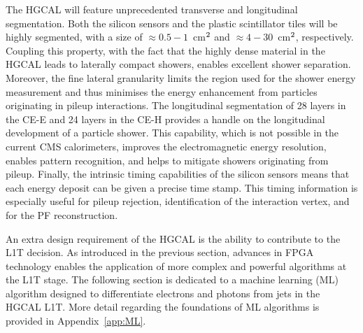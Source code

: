 The HGCAL will feature unprecedented transverse and longitudinal segmentation. Both the silicon sensors and the plastic scintillator tiles will be highly segmented, with a size of $\approx0.5-1$~cm$^{\rm{2}}$ and $\approx4-30$~cm$^{\rm{2}}$, respectively. Coupling this property, with the fact that the highly dense material in the HGCAL leads to laterally compact showers, enables excellent shower separation. Moreover, the fine lateral granularity limits the region used for the shower energy measurement and thus minimises the energy enhancement from particles originating in pileup interactions. The longitudinal segmentation of 28 layers in the CE-E and 24 layers in the CE-H provides a handle on the longitudinal development of a particle  shower. This capability, which is not possible in the current CMS calorimeters, improves the electromagnetic energy resolution, enables pattern recognition, and helps to mitigate showers originating from pileup. Finally, the intrinsic timing capabilities of the silicon sensors means that each energy deposit can be given a precise time stamp. This timing information is especially useful for pileup rejection, identification of the interaction vertex, and for the PF reconstruction.


An extra design requirement of the HGCAL is the ability to contribute to the L1T decision.
As introduced in the previous section, advances in FPGA technology enables the application of more complex and powerful algorithms at the L1T stage. The following section is dedicated to a machine learning (ML) algorithm designed to differentiate electrons and photons from jets in the HGCAL L1T. More detail regarding the foundations of ML algorithms is provided in Appendix~\ref{app:ML}.

